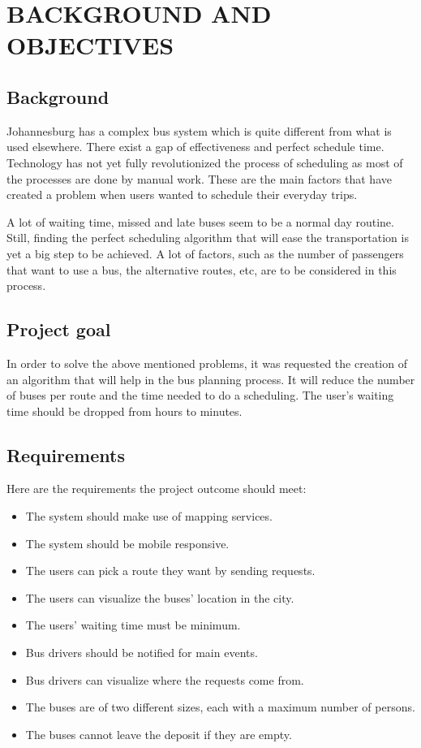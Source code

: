 \section{BACKGROUND AND OBJECTIVES}
\subsection{Background}
Johannesburg has a complex bus system which is quite different from what is used elsewhere. There exist a gap of effectiveness and perfect schedule time. Technology has not yet fully revolutionized the process of scheduling as most of the processes are done by manual work. These are the main factors that have created a problem when users wanted to schedule their everyday trips.

A lot of waiting time, missed and late buses seem to be a normal day routine. Still, finding the perfect scheduling algorithm that will ease the transportation is yet a big step to be achieved. A lot of factors, such as the number of passengers that want to use a bus, the alternative routes, etc, are to be considered in this process. 
\subsection{Project goal}
In order to solve the above mentioned problems, it was requested the creation of an algorithm that will help in the bus planning process. It will reduce the number of buses per route and the time needed to do a scheduling. The user’s waiting time should be dropped from hours to minutes. 
\subsection{Requirements}
Here are the requirements the project outcome should meet: 
\begin{itemize}
	\item The system should make use of mapping services.
	\item The system should be mobile responsive.
	\item The users can pick a route they want by sending requests.
	\item The users can visualize the buses’ location in the city. 
	\item The users’ waiting time must be minimum.
	\item Bus drivers should be notified for main events.
	\item Bus drivers can visualize where the requests come from. 
	\item The buses are of two different sizes, each with a maximum number of persons.
	\item The buses cannot leave the deposit if they are empty.
\end{itemize}


